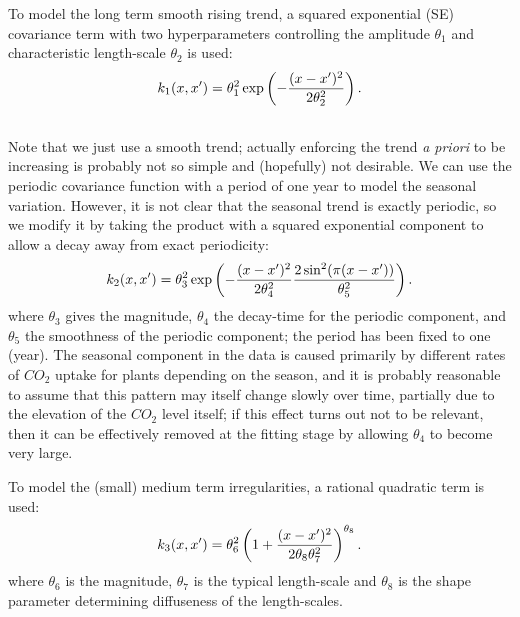 \documentclass[letterpaper,10pt,english]{sphinxmanual}
\begin{document}
To model the long term smooth rising trend, a squared exponential
(SE) covariance term with two hyperparameters controlling the amplitude $\theta_1$
and characteristic length-scale $\theta_2$ is used:
\begin{gather}
\begin{split}k_1(x,x') = \theta_1^2 \exp \left(-\frac{(x-x')^2}{2\theta_2^2}\right).\end{split}\notag\\\begin{split}\end{split}\notag
\end{gather}
Note that we just use a smooth trend; actually enforcing the trend \emph{a priori} to be increasing
is probably not so simple and (hopefully) not desirable. We can use the periodic covariance function with a period of one year to
model the seasonal variation. However, it is not clear that the seasonal trend is
exactly periodic, so we modify it by taking the product with a squared
exponential component to allow a decay away from exact periodicity:
\begin{gather}
\begin{split}k_2(x,x') = \theta_3^2 \exp\left(-\frac{(x-x')^2}{2\theta_4^2}  \frac{2\sin^2(\pi(x-x'))}{\theta_5^2}\right).\end{split}\notag
\end{gather}
where $\theta_3$ gives the magnitude, $\theta_4$ the decay-time for the periodic component, and
$\theta_5$ the smoothness of the periodic component; the period has been fixed
to one (year). The seasonal component in the data is caused primarily by
different rates of $CO_2$ uptake for plants depending on the season, and it is
probably reasonable to assume that this pattern may itself change slowly over
time, partially due to the elevation of the $CO_2$
level itself; if this effect turns out not to be relevant, then it can be effectively removed at the fitting stage by
allowing $\theta_4$ to become very large.

To model the (small) medium term irregularities, a rational quadratic term is used:
\begin{gather}
\begin{split}k_3(x,x') = \theta_6^2\left(1+\frac{(x-x')^2}{2\theta_8\theta_7^2}\right)^{\theta_8}.\end{split}\notag
\end{gather}
where $\theta_6$ is the magnitude, $\theta_7$
is the typical length-scale and $\theta_8$ is the shape parameter determining diffuseness of the length-scales.
\end{document}
